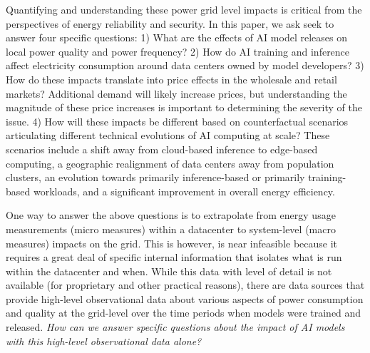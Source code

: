 \documentclass[sigconf]{acmart}
\newcommand{\nb}[1]{\textcolor{blue}{NB[#1]}}
\begin{document}
Quantifying and understanding these power grid level impacts is critical from the perspectives of energy reliability and security. In this paper, we ask seek to answer four specific questions: 1) What are the effects of AI model releases on local power quality and power frequency? 2) How do AI training and inference affect electricity consumption around data centers owned by model developers? 3) How do these impacts translate into price effects in the wholesale and retail markets? Additional demand will likely increase prices, but understanding the magnitude of these price increases is important to determining the severity of the issue. 4) How will these impacts be different based on counterfactual scenarios articulating different technical evolutions of AI computing at scale? These scenarios include a shift away from cloud-based inference to edge-based computing, a geographic realignment of data centers away from population clusters, an evolution towards primarily inference-based or primarily training-based workloads, and a significant improvement in overall energy efficiency.

One way to answer the above questions is to extrapolate from energy usage measurements (micro measures) within a datacenter to system-level (macro measures) impacts on the grid. This is however, is near infeasible because it requires a great deal of specific internal information that isolates what is run within the datacenter and when. While this data with level of detail is not available (for proprietary and other practical reasons), there are data sources that provide high-level observational data about various aspects of power consumption and quality at the grid-level over the time periods when models were trained and released. \emph{How can we answer specific questions about the impact of AI models with this high-level observational data alone?}
\end{document}
